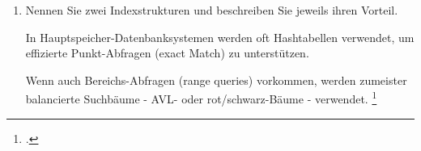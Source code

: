 \documentclass{lehramt-informatik-aufgabe}
\begin{document}
\begin{enumerate}
\begin{liAntwort}
Die transitive Hülle einer Relation R mit zwei Attributen A und B
gleichen Typs ist definitert als

Sie enthält damit alle Tupel (a, b), für die ein Pfad beliebiger Länge k
in R existiert.
\footcite[Seite 135]{kemper}

Berechnung rekursiver Anfragen (z. B. transitive Hülle) über rekursiv
definierte Sichten (Tabellen)
\end{liAntwort}


\item Nennen Sie zwei Indexstrukturen und beschreiben Sie jeweils ihren
Vorteil.

\begin{liAntwort}
In Hauptspeicher-Datenbanksystemen werden oft Hashtabellen verwendet, um
effizierte Punkt-Abfragen (exact Match) zu unterstützen.

Wenn auch Bereichs-Abfragen (range queries) vorkommen, werden zumeister
balancierte Suchbäume - AVL- oder rot/schwarz-Bäume - verwendet.
\footcite[Seite 625]{kemper}

\end{liAntwort}

\end{enumerate}
\end{document}
